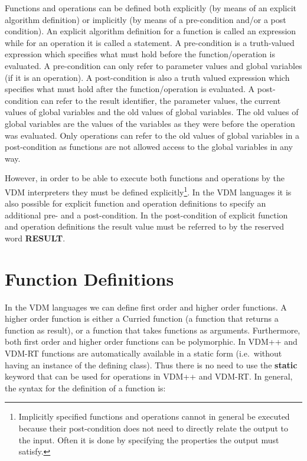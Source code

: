 \documentclass{overturerepchap}
\newcommand{\keyw}[1]{{\bf\ttfamily #1}}
\begin{document}
Functions and operations can be defined both explicitly (by means of
an explicit algorithm definition) or implicitly (by means of a
pre-condition and/or a post condition).  An explicit algorithm
definition for a function is called an expression while for an
operation it is called a statement.  A pre-condition is a truth-valued
expression which specifies what must hold before the
function/operation is evaluated. A pre-condition can only refer to
parameter values and global variables (if it is an operation).  A
post-condition is also a truth valued expression which specifies what
must hold after the function/operation is evaluated. A post-condition
can refer to the result identifier, the parameter values, the current
values of global variables and the old values of global variables. The
old values of global variables are the values of the variables as they
were before the operation was evaluated.  Only operations can refer to
the old values of global variables in a post-condition as functions
are not allowed access to the global variables in any way.

However, in order to be able to execute both functions and operations
by the VDM interpreters they must be defined explicitly\footnote{Implicitly
specified functions and operations cannot in general be executed
because their post-condition does not need to directly relate the
output to the input. Often it is done by specifying the properties the
output must satisfy.}. In the VDM languages it is also
possible for explicit function and operation definitions to specify an
additional pre- and a post-condition.  In the post-condition of 
explicit function and operation definitions the result value must be
referred to by the reserved word \keyw{RESULT}.
 
\chapter{Function Definitions}\label{functiondef}

In the VDM languages we can define first order and higher order
functions. A higher order function is either a Curried function
(a function that returns a function as result), or a function that takes
functions as arguments. Furthermore, both first order and higher order
functions can be polymorphic. In VDM++ and VDM-RT functions are
automatically available in a static form (i.e.\ without having an
instance of the defining class). Thus there is no need to use the
{\bf\ttfamily static} keyword that can be used for operations in VDM++
and VDM-RT. In general, the syntax for the definition of a
function is:
\end{document}

